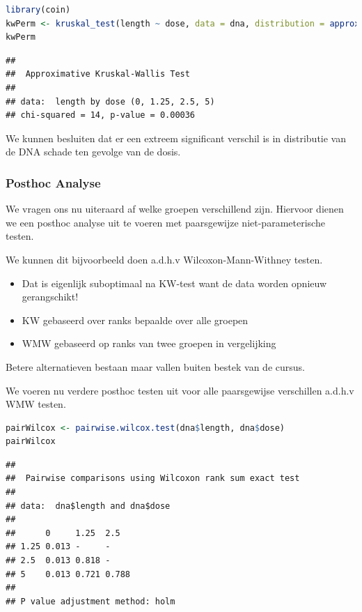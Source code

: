 \documentclass[
  12pt,dutch,coursenotes]{book}
\providecommand{\tightlist}{%
  \setlength{\itemsep}{0pt}\setlength{\parskip}{0pt}}
\begin{document}
\begin{lstlisting}[language=R]
library(coin)
kwPerm <- kruskal_test(length ~ dose, data = dna, distribution = approximate(nresample = 1e+05))
kwPerm
\end{lstlisting}

\begin{lstlisting}
## 
##  Approximative Kruskal-Wallis Test
## 
## data:  length by dose (0, 1.25, 2.5, 5)
## chi-squared = 14, p-value = 0.00036
\end{lstlisting}

We kunnen besluiten dat er een extreem significant verschil is in distributie van de DNA schade ten gevolge van de dosis.

\hypertarget{posthoc-analyse}{%
\subsubsection{Posthoc Analyse}\label{posthoc-analyse}}

We vragen ons nu uiteraard af welke groepen verschillend zijn. Hiervoor dienen we een posthoc analyse uit te voeren met paarsgewijze niet-parameterische testen.

We kunnen dit bijvoorbeeld doen a.d.h.v Wilcoxon-Mann-Withney testen.

\begin{itemize}
\tightlist
\item
  Dat is eigenlijk suboptimaal na KW-test want de data worden opnieuw gerangschikt!
\item
  KW gebaseerd over ranks bepaalde over alle groepen
\item
  WMW gebaseerd op ranks van twee groepen in vergelijking
\end{itemize}

Betere alternatieven bestaan maar vallen buiten bestek van de cursus.

We voeren nu verdere posthoc testen uit voor alle paarsgewijse verschillen a.d.h.v WMW testen.

\begin{lstlisting}[language=R]
pairWilcox <- pairwise.wilcox.test(dna$length, dna$dose)
pairWilcox
\end{lstlisting}

\begin{lstlisting}
## 
##  Pairwise comparisons using Wilcoxon rank sum exact test 
## 
## data:  dna$length and dna$dose 
## 
##      0     1.25  2.5  
## 1.25 0.013 -     -    
## 2.5  0.013 0.818 -    
## 5    0.013 0.721 0.788
## 
## P value adjustment method: holm
\end{lstlisting}
\end{document}
